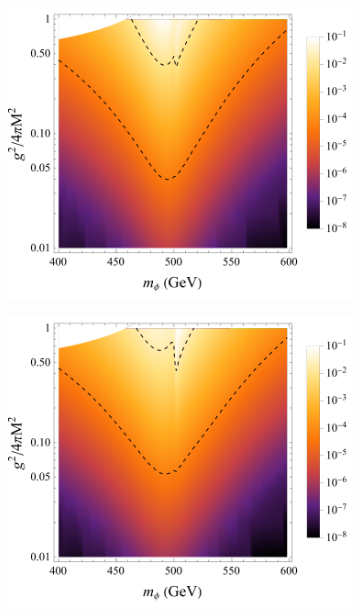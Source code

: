 \documentclass[11pt]{article}
\theoremstyle{definition}
\theoremstyle{remark}
\begin{document}
	\begin{figure}[h]
		\centering
		\begin{subfigure}{0.4\textwidth}
			\centering
			\includegraphics[width=0.9\linewidth]{scalar_0GeV.pdf}
			\caption{}
			\label{fig:luminosity_ratio_scalar:0}
		\end{subfigure}
		\begin{subfigure}{0.4\textwidth}
			\centering
			\includegraphics[width=0.9\linewidth]{scalar_10GeV.pdf}
			\caption{}
			\label{fig:luminosity_ratio_scalar:10}
		\end{subfigure}
		\begin{subfigure}{0.4\textwidth}
		\centering

\end{subfigure}
\end{figure}
\end{document}
